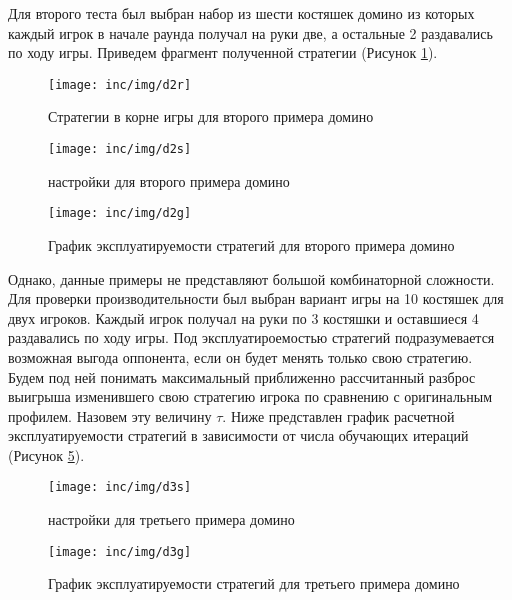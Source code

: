 \par
Для второго теста был выбран набор из шести костяшек домино из которых каждый игрок в начале раунда получал на руки две, а остальные 2 раздавались по ходу игры. Приведем фрагмент полученной стратегии (Рисунок \ref{fig:figd2r}).
\begin{figure}[H]
	\centering
	\texttt{[image: inc/img/d2r]}
	\caption{Стратегии в корне игры для второго примера домино}
	\label{fig:figd2r}
\end{figure}
\begin{figure}[H]
	\centering
	\texttt{[image: inc/img/d2s]}
	\caption{настройки для второго примера домино}
	\label{fig:figd2s}
\end{figure}
\begin{figure}[H]
	\centering
	\texttt{[image: inc/img/d2g]}
	\caption{График эксплуатируемости стратегий для второго примера домино}
	\label{fig:figd2g}
\end{figure}
\par
Однако, данные примеры не представляют большой комбинаторной сложности. Для проверки производительности был выбран вариант игры на 10 костяшек для двух игроков. Каждый игрок получал на руки по 3 костяшки и оставшиеся 4 раздавались по ходу игры. Под эксплуатироемостью стратегий подразумевается возможная выгода оппонента, если он будет менять только свою стратегию. Будем под ней понимать максимальный приближенно рассчитанный разброс выигрыша изменившего свою стратегию игрока по сравнению с оригинальным профилем. Назовем эту величину $\tau$. Ниже представлен график расчетной эксплуатируемости стратегий в зависимости от числа обучающих итераций (Рисунок \ref{fig:figd3g}).
\begin{figure}[H]
	\centering
	\texttt{[image: inc/img/d3s]}
	\caption{настройки для третьего примера домино}
	\label{fig:figd3s}
\end{figure}
\begin{figure}[H]
	\centering
	\texttt{[image: inc/img/d3g]}
	\caption{График эксплуатируемости стратегий для третьего примера домино}
	\label{fig:figd3g}
\end{figure}